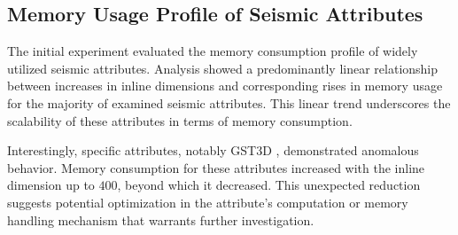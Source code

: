 \subsection{Memory Usage Profile of Seismic Attributes}


The initial experiment evaluated the memory consumption profile of widely utilized seismic attributes.
Analysis showed a predominantly linear relationship between increases in inline dimensions and corresponding rises in memory usage for the majority of examined seismic attributes.
This linear trend underscores the scalability of these attributes in terms of memory consumption.

Interestingly, specific attributes, notably GST3D , demonstrated anomalous behavior.
Memory consumption for these attributes increased with the inline dimension up to $400$, beyond which it decreased.
This unexpected reduction suggests potential optimization in the attribute's computation or memory handling mechanism that warrants further investigation.


